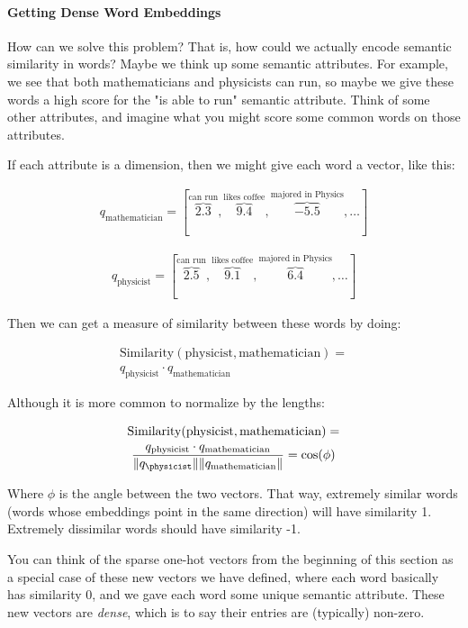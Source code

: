 \documentclass[fleqn,10pt]{SelfArx} %
\begin{document}
\paragraph{Getting Dense Word Embeddings} How can we solve this problem? That is, how could we actually encode semantic similarity in words? Maybe we think up some semantic attributes. For example, we see that both mathematicians and physicists can run, so maybe we give these words a high score for the "is able to run" semantic attribute. Think of some other attributes, and imagine what you might score some common words on those attributes.

If each attribute is a dimension, then we might give each word a vector, like this:

\begin{align}q_\text{mathematician} = \left[ \overbrace{2.3}^\text{can run},\overbrace{9.4}^\text{likes coffee}, \overbrace{-5.5}^\text{majored in Physics}, \dots \right]\end{align}

\begin{align}q_\text{physicist} = \left[ \overbrace{2.5}^\text{can run}, \overbrace{9.1}^\text{likes coffee}, \overbrace{6.4}^\text{majored in Physics}, \dots \right]\end{align}

Then we can get a measure of similarity between these words by doing:

\begin{multline}\text{Similarity}(\text{physicist}, \text{mathematician}) = \\
q_\text{physicist} \cdot q_\text{mathematician}\end{multline}

Although it is more common to normalize by the lengths:

\begin{multline}\text{Similarity}(\text{physicist}, \text{mathematician}) = \\ 
\frac{q_\text{physicist} \cdot q_\text{mathematician}}{\| q_\text{\physicist} \| \| q_\text{mathematician} \|} = \cos (\phi)\end{multline}

Where $\phi$ is the angle between the two vectors. That way, extremely similar words (words whose embeddings point in the same direction) will have similarity 1. Extremely dissimilar words should have similarity -1.

You can think of the sparse one-hot vectors from the beginning of this section as a special case of these new vectors we have defined, where each word basically has similarity 0, and we gave each word some unique semantic attribute. These new vectors are \textit{dense}, which is to say their entries are (typically) non-zero.
\end{document}
